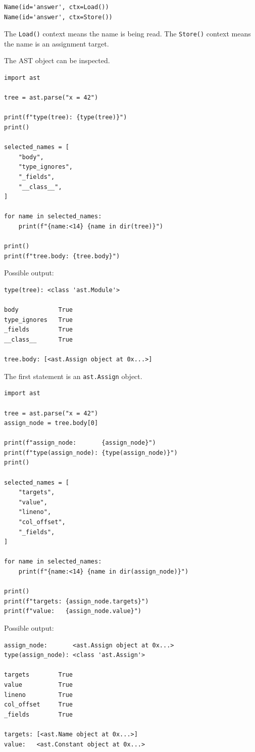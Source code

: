 \begin{verbatim}
Name(id='answer', ctx=Load())
Name(id='answer', ctx=Store())
\end{verbatim}

The \texttt{Load()} context means the name is being read. The \texttt{Store()} context means the name is an assignment target.

The AST object can be inspected.

\begin{verbatim}
import ast

tree = ast.parse("x = 42")

print(f"type(tree): {type(tree)}")
print()

selected_names = [
    "body",
    "type_ignores",
    "_fields",
    "__class__",
]

for name in selected_names:
    print(f"{name:<14} {name in dir(tree)}")

print()
print(f"tree.body: {tree.body}")
\end{verbatim}

Possible output:

\begin{verbatim}
type(tree): <class 'ast.Module'>

body           True
type_ignores   True
_fields        True
__class__      True

tree.body: [<ast.Assign object at 0x...>]
\end{verbatim}

The first statement is an \texttt{ast.Assign} object.

\begin{verbatim}
import ast

tree = ast.parse("x = 42")
assign_node = tree.body[0]

print(f"assign_node:       {assign_node}")
print(f"type(assign_node): {type(assign_node)}")
print()

selected_names = [
    "targets",
    "value",
    "lineno",
    "col_offset",
    "_fields",
]

for name in selected_names:
    print(f"{name:<14} {name in dir(assign_node)}")

print()
print(f"targets: {assign_node.targets}")
print(f"value:   {assign_node.value}")
\end{verbatim}

Possible output:

\begin{verbatim}
assign_node:       <ast.Assign object at 0x...>
type(assign_node): <class 'ast.Assign'>

targets        True
value          True
lineno         True
col_offset     True
_fields        True

targets: [<ast.Name object at 0x...>]
value:   <ast.Constant object at 0x...>
\end{verbatim}

